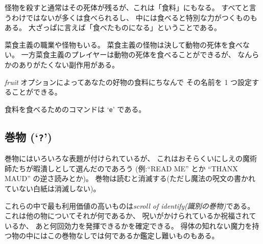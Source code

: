 怪物を殺すと通常はその死体が残るが、これは「食料」にもなる。
すべてと言うわけではないが多くは食べられるし、
中には食べると特別な力がつくものもある。
大ざっぱに言えば「食べたものになる」ということである。

菜食主義の職業や怪物もいる。
菜食主義の怪物は決して動物の死体を食べない。
一方菜食主義のプレイヤーは動物の死体を食べることができるが、
なんらかのありがたくない副作用がある。

{\it fruit\/} オプションによってあなたの好物の食料にちなんで
その名前を 1 つ設定することができる。

食料を食べるためのコマンドは `{\tt e}' である。

\subsection*{巻物 (`{\tt ?}')}

巻物にはいろいろな表題が付けられているが、
これはおそらくいにしえの魔術師たちが暇潰しとして選んだのであろう
(例:``READ ME'' とか ``THANX MAUD'' の逆さ読みとか)。
巻物は読むと消滅する(ただし魔法の呪文の書かれていない白紙は消滅しない)。

これらの中で最も利用価値の高いものは{\it scroll of identify(識別の巻物)}である。
これは他の物についてそれが何であるか、
呪いがかけられているか祝福されているか、
あと何回効力を発揮できるかを確定できる。
得体の知れない魔力を持つ物の中にはこの巻物なしでは何であるか鑑定し難いものもある。

